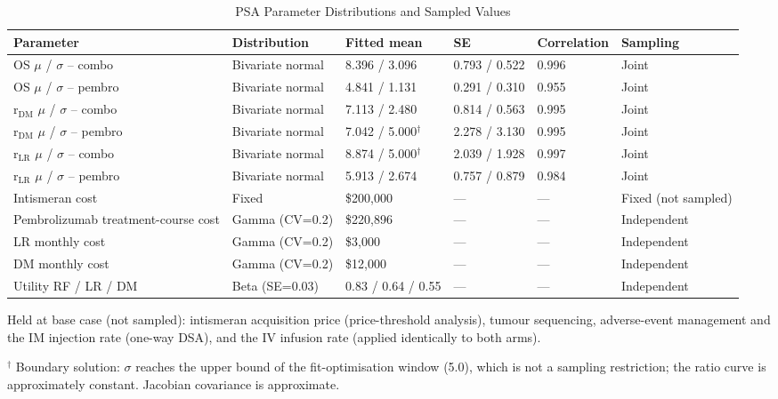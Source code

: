 \documentclass[11pt,a4paper]{article}
\begin{document}
\begin{landscape}
\begin{table}[p]
\centering
\caption{PSA Parameter Distributions and Sampled Values}
\label{tab:s12}
\footnotesize
\setlength{\tabcolsep}{5pt}
\begin{tabularx}{\linewidth}{@{}>{\raggedright\arraybackslash}Xlllll@{}}
\toprule
\textbf{Parameter} & \textbf{Distribution} & \textbf{Fitted mean} & \textbf{SE} & \textbf{Correlation} & \textbf{Sampling} \\
\midrule
OS $\mu$ / $\sigma$ -- combo & Bivariate normal & 8.396 / 3.096 & 0.793 / 0.522 & 0.996 & Joint \\
OS $\mu$ / $\sigma$ -- pembro & Bivariate normal & 4.841 / 1.131 & 0.291 / 0.310 & 0.955 & Joint \\
r$_{\text{DM}}$ $\mu$ / $\sigma$ -- combo & Bivariate normal & 7.113 / 2.480 & 0.814 / 0.563 & 0.995 & Joint \\
r$_{\text{DM}}$ $\mu$ / $\sigma$ -- pembro & Bivariate normal & 7.042 / 5.000$^{\dagger}$ & 2.278 / 3.130 & 0.995 & Joint \\
r$_{\text{LR}}$ $\mu$ / $\sigma$ -- combo & Bivariate normal & 8.874 / 5.000$^{\dagger}$ & 2.039 / 1.928 & 0.997 & Joint \\
r$_{\text{LR}}$ $\mu$ / $\sigma$ -- pembro & Bivariate normal & 5.913 / 2.674 & 0.757 / 0.879 & 0.984 & Joint \\
Intismeran cost & Fixed & \$200,000 & --- & --- & Fixed (not sampled) \\
Pembrolizumab treatment-course cost & Gamma (CV=0.2) & \$220,896 & --- & --- & Independent \\
LR monthly cost & Gamma (CV=0.2) & \$3,000 & --- & --- & Independent \\
DM monthly cost & Gamma (CV=0.2) & \$12,000 & --- & --- & Independent \\
Utility RF / LR / DM & Beta (SE=0.03) & 0.83 / 0.64 / 0.55 & --- & --- & Independent \\
\bottomrule
\end{tabularx}
\vspace{4pt}
\begin{minipage}[t]{\linewidth}
\footnotesize
Held at base case (not sampled): intismeran acquisition price (price-threshold analysis), tumour sequencing, adverse-event management and the IM injection rate (one-way DSA), and the IV infusion rate (applied identically to both arms).

\vspace{2pt}
$^{\dagger}$ Boundary solution: $\sigma$ reaches the upper bound of the fit-optimisation window (5.0), which is not a sampling restriction; the ratio curve is approximately constant. Jacobian covariance is approximate.
\end{minipage}
\end{table}
\end{landscape}
\end{document}
